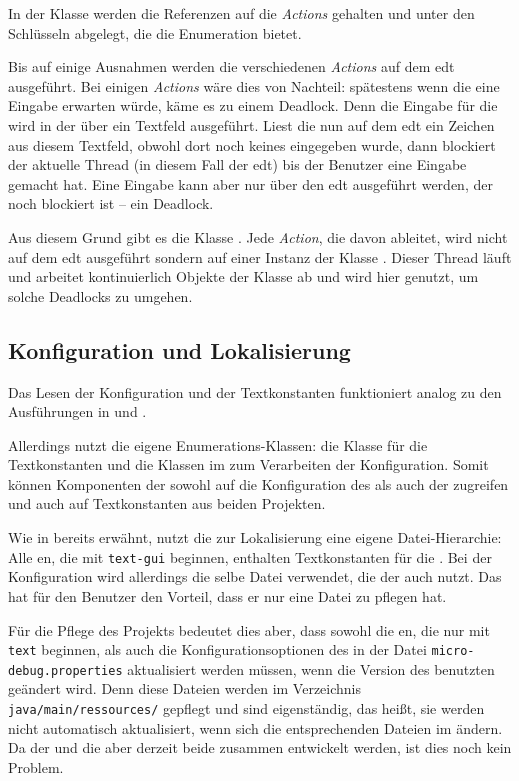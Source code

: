 In der Klasse  werden die Referenzen auf die \emph{Actions} gehalten und unter den Schlüsseln abgelegt, die die Enumeration  bietet.

Bis auf einige Ausnahmen werden die verschiedenen \emph{Actions} auf dem \gls{edt} ausgeführt. Bei einigen \emph{Actions} wäre dies von Nachteil: spätestens wenn die \mic eine Eingabe erwarten würde, käme es zu einem Deadlock. Denn die Eingabe für die \mic wird in der \mdg über ein Textfeld ausgeführt. Liest die \mic nun auf dem \gls{edt} ein Zeichen aus diesem Textfeld, obwohl dort noch keines eingegeben wurde, dann blockiert der aktuelle Thread (in diesem Fall der \gls{edt}) bis der Benutzer eine Eingabe gemacht hat. Eine Eingabe kann aber nur über den \gls{edt} ausgeführt werden, der noch blockiert ist -- ein Deadlock.

Aus diesem Grund gibt es die Klasse . Jede \emph{Action}, die davon ableitet, wird nicht auf dem \gls{edt} ausgeführt sondern auf einer Instanz der Klasse . Dieser Thread läuft und arbeitet kontinuierlich Objekte der Klasse  ab und wird hier genutzt, um solche Deadlocks zu umgehen.

\subsection{Konfiguration und Lokalisierung}
Das Lesen der Konfiguration und der Textkonstanten funktioniert analog zu den Ausführungen in  und .

Allerdings nutzt die \mdg eigene Enumerations-Klassen: die Klasse  für die Textkonstanten und die Klassen im \package {} zum Verarbeiten der Konfiguration. Somit können Komponenten der \mdg sowohl auf die Konfiguration des \md als auch der \mdg zugreifen und auch auf Textkonstanten aus beiden Projekten.

Wie in  bereits erwähnt, nutzt die \mdg zur Lokalisierung eine eigene Datei-Hierarchie: Alle en, die mit \texttt{text-gui} beginnen, enthalten Textkonstanten für die \mdg. Bei der Konfiguration wird allerdings die selbe Datei verwendet, die der \md auch nutzt. Das hat für den Benutzer den Vorteil, dass er nur eine Datei zu pflegen hat.

Für die Pflege des Projekts \mdg bedeutet dies aber, dass sowohl die en, die nur mit \texttt{text} beginnen, als auch die Konfigurationsoptionen des \md in der Datei \texttt{micro-debug.properties} aktualisiert werden müssen, wenn die Version des benutzten \md geändert wird. Denn diese Dateien werden im Verzeichnis \texttt{java/main/ressources/} gepflegt und sind eigenständig, das heißt, sie werden nicht automatisch aktualisiert, wenn sich die entsprechenden Dateien im \md ändern. Da der \md und die \mdg aber derzeit beide zusammen entwickelt werden, ist dies noch kein Problem.

